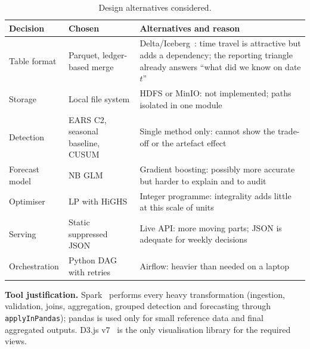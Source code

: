 \begin{table}[t]\caption{Design alternatives considered.}\label{tab:alt}\centering\small
\begin{tabularx}{\columnwidth}{@{}lXX@{}}\toprule
Decision & Chosen & Alternatives and reason \\\midrule
Table format & Parquet, ledger-based merge & Delta/Iceberg~\cite{delta}: time travel is attractive but adds a dependency; the reporting triangle already answers ``what did we know on date $t$'' \\
Storage & Local file system & HDFS or MinIO: not implemented; paths isolated in one module \\
Detection & EARS C2, seasonal baseline, CUSUM & Single method only: cannot show the trade-off or the artefact effect \\
Forecast model & NB GLM & Gradient boosting: possibly more accurate but harder to explain and to audit \\
Optimiser & LP with HiGHS & Integer programme: integrality adds little at this scale of units \\
Serving & Static suppressed JSON & Live API: more moving parts; JSON is adequate for weekly decisions \\
Orchestration & Python DAG with retries & Airflow: heavier than needed on a laptop \\\bottomrule
\end{tabularx}\end{table}

\textbf{Tool justification.} Spark~\cite{spark} performs every heavy transformation (ingestion, validation, joins, aggregation, grouped detection and forecasting through \texttt{applyInPandas}); pandas is used only for small reference data and final aggregated outputs. D3.js v7~\cite{d3} is the only visualisation library for the required views.

